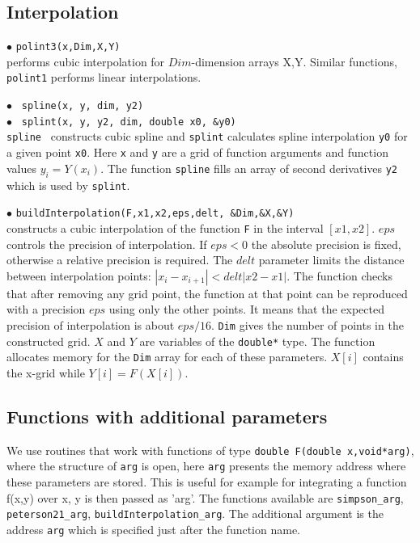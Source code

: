 \documentclass[12pt,a4paper]{article}
\begin{document}
\subsection{Interpolation}
\noindent$\bullet$ \verb|polint3(x,Dim,X,Y)|\\
performs   cubic interpolation for $Dim$-dimension arrays X,Y. Similar 
functions, \verb|polint1|  performs linear interpolations.

\noindent$\bullet$ \verb| spline(x, y, dim, y2)|\\
\noindent$\bullet$ \verb| splint(x, y, y2, dim, double x0, &y0)|\\
{\tt spline } constructs cubic  spline and {\tt splint} calculates spline
interpolation \verb|y0|  for a given point \verb|x0|. Here  {\tt x} and {\tt y} are a 
grid of function arguments and function values $y_i= Y(x_i)$. The 
function {\tt spline} fills   an array of second  derivatives {\tt y2} which is 
used by  {\tt splint}.
   

\noindent$\bullet$ \verb|buildInterpolation(F,x1,x2,eps,delt, &Dim,&X,&Y)|\\
constructs  a cubic interpolation of the function \verb|F| in the interval $[x1,x2]$.
$eps$ controls the precision of interpolation. If $eps < 0$ the absolute 
precision is fixed, otherwise a relative precision is required.
The $delt$ parameter limits the  distance between  interpolation points: $|x_i
-x_{i+1}|<delt|x2-x1|$.  
The function checks that after removing any grid point, the function at that point
can be reproduced with a precision $eps$ using only the other points.  It means that
the expected precision of interpolation is about $eps/16$. \verb|Dim| gives the number 
of points in the  constructed grid. $X$ and $Y$ are variables of the  
\verb|double*| type. The function allocates memory for the  \verb|Dim| array for each 
 of these parameters. $X[i]$ contains the x-grid while $Y[i]=F(X[i])$.

\subsection{Functions with additional parameters}

We use routines that work with functions of type \verb|double F(double x,void*arg)|,  where the structure of \verb|arg| is open, here  {\tt arg} presents the  memory address where these parameters are stored.  This is useful for example for integrating a function f(x,y) over x, y is then passed as 'arg'.
The functions available are \verb|simpson_arg|,  \verb|peterson21_arg|,  \verb|buildInterpolation_arg|. The additional
argument is the address {\tt arg} which is  specified just after the function name.
\end{document}
